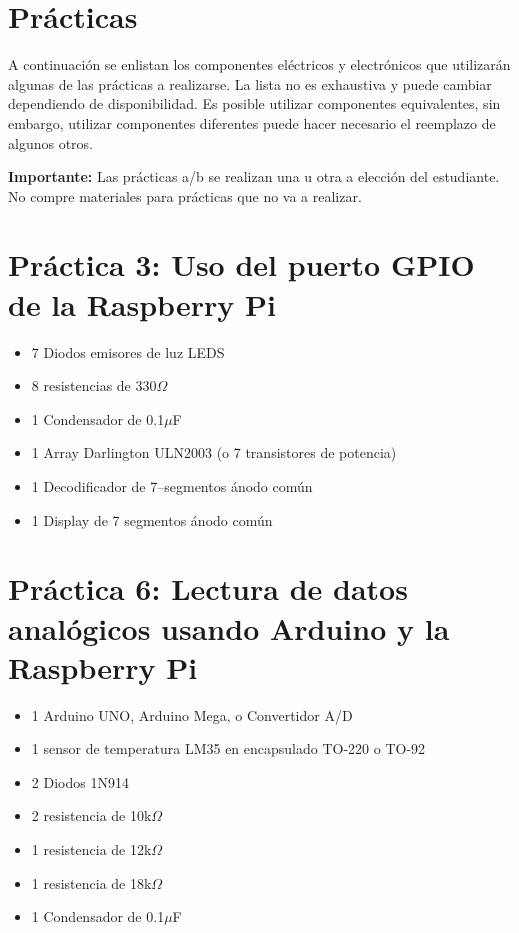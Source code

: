 \documentclass[letterpaper,10.5pt]{article}
\begin{document}
\section{Prácticas}

A continuación se enlistan los componentes eléctricos y electrónicos que utilizarán algunas de las prácticas a realizarse. La lista no es exhaustiva y puede cambiar dependiendo de disponibilidad.
Es posible utilizar componentes equivalentes, sin embargo, utilizar componentes diferentes puede hacer necesario el reemplazo de algunos otros.

\textbf{Importante:} Las prácticas a/b se realizan una u otra a elección del estudiante.
No compre materiales para prácticas que no va a realizar.



\section{Práctica 3: Uso del puerto GPIO de la Raspberry Pi} %
\begin{itemize}[noitemsep]
	\item 7 Diodos emisores de luz LEDS
	\item 8 resistencias de 330$\Omega$
	\item 1 Condensador de 0.1$\mu$F
	\item 1 Array Darlington ULN2003 (o 7 transistores de potencia)
	\item 1 Decodificador de 7--segmentos ánodo común
	\item 1 Display de 7 segmentos ánodo común
\end{itemize}



\section{Práctica 6: Lectura de datos analógicos usando Arduino y la Raspberry Pi} %
\begin{itemize}[noitemsep]
	\item 1 Arduino UNO, Arduino Mega, o Convertidor A/D \IIC{}
	\item 1 sensor de temperatura LM35 en encapsulado TO-220 o TO-92
	\item 2 Diodos 1N914
	\item 2 resistencia de 10k$\Omega$
	\item 1 resistencia de 12k$\Omega$\footnotemark
	\item 1 resistencia de 18k$\Omega$
	\item 1 Condensador de 0.1$\mu$F
\end{itemize}
\end{document}
